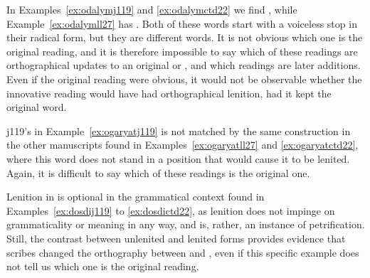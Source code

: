 In Examples~\ref{ex:odalymj119} and \ref{ex:odalymctd22} we find , while Example~\ref{ex:odalymll27} has . Both of these words start with a voiceless stop in their radical form, but they are different words. It is not obvious which one is the original reading, and it is therefore impossible to say which of these readings are orthographical updates to an original  or , and which readings are later additions. Even if the original reading were obvious, it would not be observable whether the innovative reading would have had orthographical lenition, had it kept the original word.

\begin{mwl}
\end{mwl}
\Gls{j119}'s  in Example~\ref{ex:ogaryatj119} is not matched by the same construction in the other manuscripts found in Examples~\ref{ex:ogaryatll27} and \ref{ex:ogaryatctd22}, where this word does not stand in a position that would cause it to be lenited. Again, it is difficult to say which of these readings is the original one.

\begin{mwl}
\end{mwl}

Lenition in  is optional in the grammatical context found in Examples~\ref{ex:dosdij119} to \ref{ex:dosdictd22}, as lenition does not impinge on grammaticality or meaning in any way, and is, rather, an instance of petrification. Still, the contrast between unlenited and lenited forms provides evidence that scribes changed the orthography between  and , even if this specific example does not tell us which one is the original reading.

